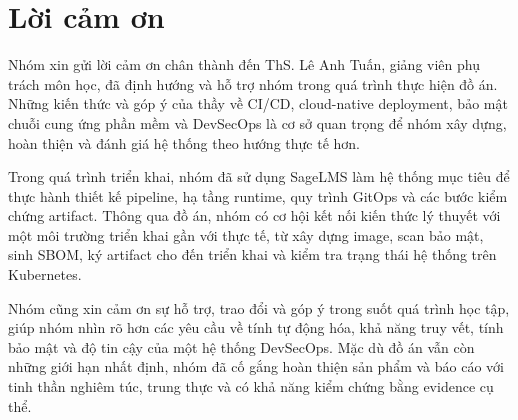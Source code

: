 \chapter*{Lời cảm ơn}

Nhóm xin gửi lời cảm ơn chân thành đến ThS. Lê Anh Tuấn, giảng viên phụ trách môn học, đã định hướng và hỗ trợ nhóm trong quá trình thực hiện đồ án. Những kiến thức và góp ý của thầy về CI/CD, cloud-native deployment, bảo mật chuỗi cung ứng phần mềm và DevSecOps là cơ sở quan trọng để nhóm xây dựng, hoàn thiện và đánh giá hệ thống theo hướng thực tế hơn.

Trong quá trình triển khai, nhóm đã sử dụng SageLMS làm hệ thống mục tiêu để thực hành thiết kế pipeline, hạ tầng runtime, quy trình GitOps và các bước kiểm chứng artifact. Thông qua đồ án, nhóm có cơ hội kết nối kiến thức lý thuyết với một môi trường triển khai gần với thực tế, từ xây dựng image, scan bảo mật, sinh SBOM, ký artifact cho đến triển khai và kiểm tra trạng thái hệ thống trên Kubernetes.

Nhóm cũng xin cảm ơn sự hỗ trợ, trao đổi và góp ý trong suốt quá trình học tập, giúp nhóm nhìn rõ hơn các yêu cầu về tính tự động hóa, khả năng truy vết, tính bảo mật và độ tin cậy của một hệ thống DevSecOps. Mặc dù đồ án vẫn còn những giới hạn nhất định, nhóm đã cố gắng hoàn thiện sản phẩm và báo cáo với tinh thần nghiêm túc, trung thực và có khả năng kiểm chứng bằng evidence cụ thể.
